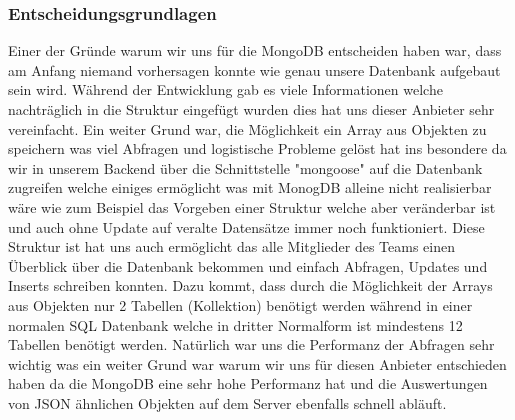 		\subsubsection{Entscheidungsgrundlagen}
			Einer der Gründe warum wir uns für die MongoDB entscheiden haben war, dass am Anfang niemand vorhersagen konnte wie genau unsere Datenbank aufgebaut sein wird. Während der Entwicklung gab es viele Informationen welche nachträglich in die Struktur eingefügt wurden dies hat uns dieser Anbieter sehr vereinfacht. Ein weiter Grund war, die Möglichkeit ein Array aus Objekten zu speichern was viel Abfragen und logistische Probleme gelöst hat ins besondere da wir in unserem Backend über die Schnittstelle "mongoose" auf die Datenbank zugreifen welche einiges ermöglicht was mit MonogDB alleine nicht realisierbar wäre wie zum Beispiel das Vorgeben einer Struktur welche aber veränderbar ist und auch ohne Update auf veralte Datensätze immer noch funktioniert. Diese Struktur ist hat uns auch ermöglicht das alle Mitglieder des Teams einen Überblick über die Datenbank bekommen und einfach Abfragen, Updates und Inserts schreiben konnten. Dazu kommt, dass durch die Möglichkeit der Arrays aus Objekten nur 2 Tabellen (Kollektion) benötigt werden während in einer normalen SQL Datenbank welche in dritter Normalform ist mindestens 12 Tabellen benötigt werden. Natürlich war uns die Performanz der Abfragen sehr wichtig was ein weiter Grund war warum wir uns für diesen Anbieter entschieden haben da die MongoDB eine sehr hohe Performanz hat und die Auswertungen von JSON ähnlichen Objekten auf dem Server ebenfalls schnell abläuft.

\newpage